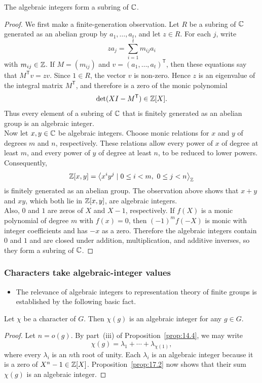 \documentclass[../Odyssey_Project.tex]{subfiles}
\begin{document}
\begin{proposition}
\label{prop:17.2}
The algebraic integers form a subring of $\mathbb{C}$.
\end{proposition}
\begin{proof}
    We first make a finite-generation observation. Let $R$ be a subring of $\mathbb{C}$ generated as an abelian group by $a_1,\ldots,a_t$, and let $z\in R$. For each $j$, write
    \[
        za_j=\sum_{i=1}^{t}m_{ij}a_i
    \]
    with $m_{ij}\in\mathbb{Z}$. If $M=(m_{ij})$ and $v=(a_1,\ldots,a_t)^{\mathsf{T}}$, then these equations say that $M^{\mathsf{T}}v=zv$. Since $1\in R$, the vector $v$ is non-zero. Hence $z$ is an eigenvalue of the integral matrix $M^{\mathsf{T}}$, and therefore is a zero of the monic polynomial
    \[
        \det(XI-M^{\mathsf{T}})\in\mathbb{Z}[X].
    \]
    Thus every element of a subring of $\mathbb{C}$ that is finitely generated as an abelian group is an algebraic integer.\\
    Now let $x,y\in\mathbb{C}$ be algebraic integers. Choose monic relations for $x$ and $y$ of degrees $m$ and $n$, respectively. These relations allow every power of $x$ of degree at least $m$, and every power of $y$ of degree at least $n$, to be reduced to lower powers. Consequently,
    \[
        \Z[x,y]=\left\langle x^i y^j\mid 0\leq i<m,\ 0\leq j<n\right\rangle_{\Z}
    \]
    is finitely generated as an abelian group. The observation above shows that $x+y$ and $xy$, which both lie in $\mathbb{Z}[x,y]$, are algebraic integers.\\
    Also, $0$ and $1$ are zeros of $X$ and $X-1$, respectively. If $f(X)$ is a monic polynomial of degree $m$ with $f(x)=0$, then $(-1)^m f(-X)$ is monic with integer coefficients and has $-x$ as a zero. Therefore the algebraic integers contain $0$ and $1$ and are closed under addition, multiplication, and additive inverses, so they form a subring of $\mathbb{C}$.
\end{proof}

\subsubsection*{Characters take algebraic-integer values}
\begin{itemize}
    \item The relevance of algebraic integers to representation theory of finite groups is established by the following basic fact.
\end{itemize}

\begin{proposition}
\label{prop:17.3}
Let $\chi$ be a character of $G$. Then $\chi(g)$ is an algebraic integer for any $g \in G$.
\end{proposition}
\begin{proof}
    Let $n=o(g)$. By part~(iii) of Proposition~\ref{prop:14.4}, we may write
    \[
        \chi(g)=\lambda_1+\cdots+\lambda_{\chi(1)},
    \]
    where every $\lambda_i$ is an $n$th root of unity. Each $\lambda_i$ is an algebraic integer because it is a zero of $X^n-1\in\mathbb{Z}[X]$. Proposition~\ref{prop:17.2} now shows that their sum $\chi(g)$ is an algebraic integer.
\end{proof}
\end{document}
